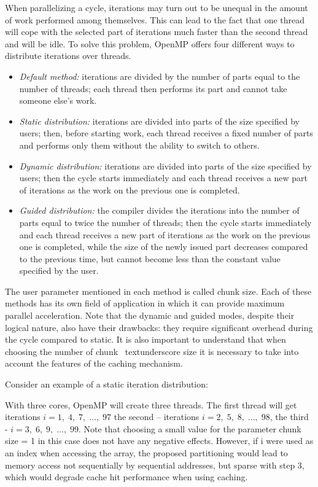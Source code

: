 {	\par When parallelizing a cycle, iterations may turn out to be unequal in the amount of work performed among themselves. This can lead to the fact that one thread will cope with the selected part of iterations much faster than the second thread and will be idle. To solve this problem, OpenMP offers four different ways to distribute iterations over threads. 
	\begin{itemize}
		\item\textit{Default method:} iterations are divided by the number of parts equal to the number of threads; each thread then performs its part and cannot take someone else's work.
		\item\textit{Static distribution:} iterations are divided into parts of the size specified by users; then, before starting work, each thread receives a fixed number of parts and performs only them without the ability to switch to others.
		\item\textit{Dynamic distribution:} iterations are divided into parts of the size specified by users; then the cycle starts immediately and each thread receives a new part of iterations as the work on the previous one is completed.
		\item\textit{Guided distribution:} the compiler divides the iterations into the number of parts equal to twice the number of threads; then the cycle starts immediately and each thread receives a new part of iterations as the work on the previous one is completed, while the size of the newly issued part decreases compared to the previous time, but cannot become less than the constant value specified by the user.
	\end{itemize}
	\par The user parameter mentioned in each method is called chunk \textunderscore size. Each of these methods has its own field of application in which it can provide maximum parallel acceleration. Note that the dynamic and guided modes, despite their logical nature, also have their drawbacks: they require significant overhead during the cycle compared to static. It is also important to understand that when choosing the number of chunk \ textunderscore size it is necessary to take into account the features of the caching mechanism.
	\par Consider an example of a static iteration distribution:
	\begin{figure}[H]
		
	\end{figure}
	\par With three cores, OpenMP will create three threads. The first thread will get iterations $i=1,\;4,\;7,\;…,\;97$ the second – iterations $i=2,\;5,\;8,\;…,\;98$, the third -  $i=3,\;6,\;9,\;…,\;99$. Note that choosing a small value for the parameter chunk \textunderscore size = 1 in this case does not have any negative effects. However, if i were used as an index when accessing the array, the proposed partitioning would lead to memory access not sequentially by sequential addresses, but sparse with step 3, which would degrade cache hit performance when using caching.
}
